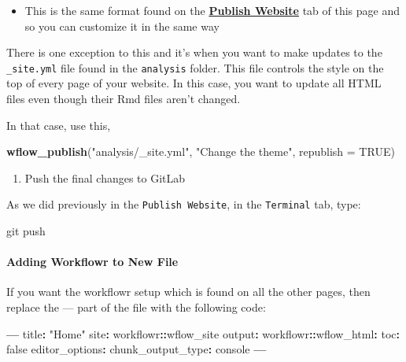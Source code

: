 \documentclass[openany]{article}
\newenvironment{Shaded}{\begin{snugshade}}{\end{snugshade}}
\newcommand{\DataTypeTok}[1]{\textcolor[rgb]{0.13,0.29,0.53}{#1}}
\newcommand{\KeywordTok}[1]{\textcolor[rgb]{0.13,0.29,0.53}{\textbf{#1}}}
\newcommand{\NormalTok}[1]{#1}
\newcommand{\OperatorTok}[1]{\textcolor[rgb]{0.81,0.36,0.00}{\textbf{#1}}}
\newcommand{\OtherTok}[1]{\textcolor[rgb]{0.56,0.35,0.01}{#1}}
\newcommand{\StringTok}[1]{\textcolor[rgb]{0.31,0.60,0.02}{#1}}
\providecommand{\tightlist}{%
  \setlength{\itemsep}{0pt}\setlength{\parskip}{0pt}}
\let\oldparagraph\paragraph
\renewcommand{\paragraph}[1]{\oldparagraph{#1}\mbox{}}
\begin{document}
\begin{itemize}
\tightlist
\item
  This is the same format found on the \protect\hyperlink{publish-website}{\textbf{Publish Website}} tab of this page and so you can customize it in the same way
\end{itemize}

There is one exception to this and it's when you want to make updates to the \texttt{\_site.yml} file found in the \texttt{analysis} folder. This file controls the style on the top of every page of your website. In this case, you want to update all HTML files even though their Rmd files aren't changed.

In that case, use this,

\begin{Shaded}
\begin{Highlighting}[]
\KeywordTok{wflow_publish}\NormalTok{(}\StringTok{"analysis/_site.yml"}\NormalTok{, }\StringTok{"Change the theme"}\NormalTok{, }\DataTypeTok{republish =} \OtherTok{TRUE}\NormalTok{)}
\end{Highlighting}
\end{Shaded}

\begin{enumerate}
\def\labelenumi{\arabic{enumi}.}
\setcounter{enumi}{2}
\tightlist
\item
  Push the final changes to GitLab
\end{enumerate}

As we did previously in the \texttt{Publish\ Website}, in the \texttt{Terminal} tab, type:

\begin{Shaded}
\begin{Highlighting}[]
\NormalTok{git push}
\end{Highlighting}
\end{Shaded}

\hypertarget{adding-workflowr-to-new-file}{%
\paragraph{Adding Workflowr to New File}\label{adding-workflowr-to-new-file}}

If you want the workflowr setup which is found on all the other pages, then replace the --- part of the file with the following code:

\begin{Shaded}
\begin{Highlighting}[]
            \OperatorTok{---}
\StringTok{            }\NormalTok{title}\OperatorTok{:}\StringTok{ "Home"}
\NormalTok{            site}\OperatorTok{:}\StringTok{ }\NormalTok{workflowr}\OperatorTok{::}\NormalTok{wflow_site}
\NormalTok{            output}\OperatorTok{:}
\StringTok{              }\NormalTok{workflowr}\OperatorTok{::}\NormalTok{wflow_html}\OperatorTok{:}
\StringTok{                }\NormalTok{toc}\OperatorTok{:}\StringTok{ }\NormalTok{false}
\NormalTok{            editor_options}\OperatorTok{:}
\StringTok{              }\NormalTok{chunk_output_type}\OperatorTok{:}\StringTok{ }\NormalTok{console}
            \OperatorTok{---}
\end{Highlighting}
\end{Shaded}
\end{document}
